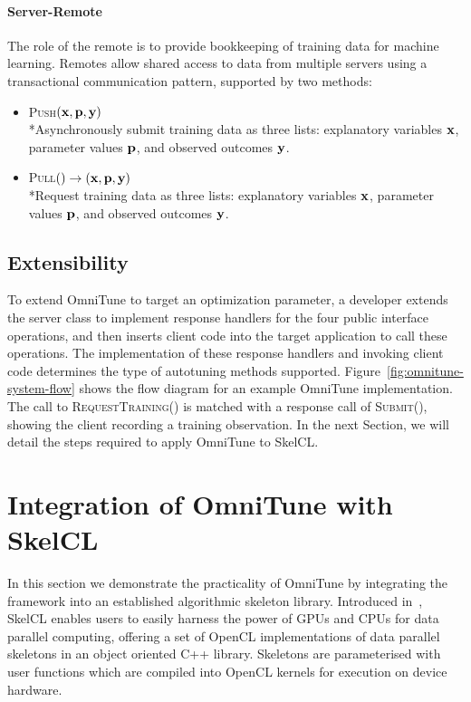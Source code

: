 \paragraph{Server-Remote} The role of the remote is to provide
bookkeeping of training data for machine learning. Remotes allow
shared access to data from multiple servers using a transactional
communication pattern, supported by two methods:
%
\begin{itemize}
\item \textsc{Push}$(\bf{x}, \bf{p}, \bf{y})$\\*Asynchronously submit
  training data as three lists: explanatory variables $\bf{x}$,
  parameter values $\bf{p}$, and observed outcomes $\bf{y}$.
\item \textsc{Pull}$() \to (\bf{x}, \bf{p}, \bf{y})$\\*Request
  training data as three lists: explanatory variables $\bf{x}$,
  parameter values $\bf{p}$, and observed outcomes $\bf{y}$.
\end{itemize}


\subsection{Extensibility}

To extend OmniTune to target an optimization parameter, a developer
extends the server class to implement response handlers for the four
public interface operations, and then inserts client code into the
target application to call these operations. The implementation of
these response handlers and invoking client code determines the type
of autotuning methods supported. Figure~\ref{fig:omnitune-system-flow}
shows the flow diagram for an example OmniTune implementation. The
call to \textsc{RequestTraining()} is matched with a response call of
\textsc{Submit()}, showing the client recording a training
observation. In the next Section, we will detail the steps required to
apply OmniTune to SkelCL.


\section{Integration of OmniTune with SkelCL}\label{sec:omnitune-skelcl}

In this section we demonstrate the practicality of OmniTune by
integrating the framework into an established algorithmic skeleton
library. Introduced in~\cite{Steuwer2011}, SkelCL enables users to
easily harness the power of GPUs and CPUs for data parallel computing,
offering a set of OpenCL implementations of data parallel skeletons in
an object oriented C++ library. Skeletons are parameterised with user
functions which are compiled into OpenCL kernels for execution on
device hardware.

